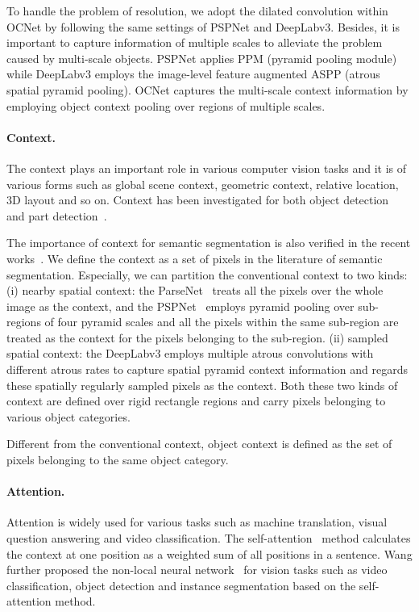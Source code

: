 \documentclass[10pt,twocolumn,letterpaper]{article}
\begin{document}
To handle the problem of resolution, we adopt the dilated convolution within OCNet by following the same settings of PSPNet and DeepLabv3.
Besides, it is important to capture information of multiple scales to alleviate the problem caused by multi-scale objects. PSPNet applies PPM (pyramid pooling module) while DeepLabv3 employs the image-level feature augmented ASPP (atrous spatial pyramid pooling).
OCNet captures the multi-scale context information by employing object context pooling over regions of multiple scales.

\paragraph{Context.}
The context plays an important role in various computer vision tasks and it is of various forms such as global scene context, geometric context, relative location, 3D layout and so on.
Context has been investigated for both object detection~\cite{divvala2009empirical,Liu_2018_CVPR} and part detection~\cite{Gonzalez-Garcia_2018_CVPR}.

The importance of context for semantic segmentation is also verified in the recent works~\cite{liu2015parsenet,zhao2017pyramid,chen2017rethinking}.
We define the context as a set of pixels in the literature of semantic segmentation.
Especially, we can partition the conventional context to two kinds:
(i) nearby spatial context: the ParseNet~\cite{liu2015parsenet} treats all the pixels over the whole image as the context, and the PSPNet~\cite{zhao2017pyramid} employs pyramid pooling over sub-regions of four pyramid scales and all the pixels within the same sub-region are treated as
the context for the pixels belonging to the sub-region.
(ii) sampled spatial context:  the DeepLabv3 employs multiple atrous convolutions with different atrous rates to capture spatial pyramid context information and regards these spatially regularly sampled pixels as the context.
Both these two kinds of context are defined over rigid rectangle regions and carry pixels belonging to various object categories.

Different from the conventional context, object context is defined as the set of pixels belonging to the same object category.


\paragraph{Attention.}
Attention is widely used for various tasks such as machine translation, visual question answering and video classification.
The self-attention~\cite{lin2017structured,vaswani2017attention} method calculates the context at one position as a weighted sum of all positions in a sentence.
Wang \etal  further proposed the non-local neural network~\cite{wang2018non} for vision tasks such as video classification, object detection and instance segmentation based on the self-attention method.
\end{document}
